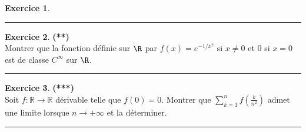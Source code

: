 \documentclass[a4paper,11pt]{article}
\theoremstyle{definition}
\newtheorem{exo}{Exercice} %
\begin{document}
\begin{minipage}{1\linewidth}
\begin{minipage}[t]{0.48\linewidth}
\begin{exo}
			\centering
			\rule{1\linewidth}{0.6pt}
			\end{exo}
		
				\begin{exo}\textbf{(**)}\quad\\[0.2cm]
			Montrer que la fonction définie sur $\R$ par $f(x)=e^{-1/x^2}$ si $x\neq0$ et $0$ si $x=0$ est de classe $C^\infty$ sur $\R$.
			
			
			\centering
			\rule{1\linewidth}{0.6pt}
		\end{exo}
	
		\begin{exo}\textbf{(***)}\quad\\[0.2cm]
		
		Soit $f:\mathbb R\to\mathbb R$ dérivable telle que $f(0)=0$. Montrer que
		$\sum_{k=1}^n f\left(\frac k{n^2}\right)$ admet une limite lorsque $n\to+\infty$ et la déterminer.
		
		
		\centering
		\rule{1\linewidth}{0.6pt}
	\end{exo}
	

		
		
	\end{minipage}
\end{minipage}
\end{document}
